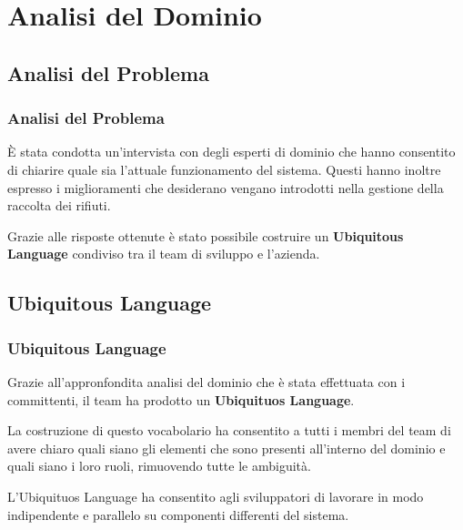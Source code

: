 \section{Analisi del Dominio}
\frame{\tableofcontents[currentsection]}

\subsection{Analisi del Problema}

\begin{frame}
    \frametitle{Analisi del Problema}
    È stata condotta un'intervista con degli esperti di dominio che hanno consentito di chiarire quale sia l'attuale
    funzionamento del sistema.
    Questi hanno inoltre espresso i miglioramenti che desiderano vengano introdotti nella gestione della raccolta dei
    rifiuti.

    \bigskip

    Grazie alle risposte ottenute è stato possibile costruire un \textbf{Ubiquitous Language} condiviso tra il team di sviluppo
    e l'azienda.

\end{frame}

\subsection{Ubiquitous Language}

\begin{frame}
    \frametitle{Ubiquitous Language}
    Grazie all'appronfondita analisi del dominio che è stata effettuata con i committenti, il team ha prodotto un
    \textbf{Ubiquituos Language}.

    \bigskip

    La costruzione di questo vocabolario ha consentito a tutti i membri del team di avere chiaro quali siano gli
    elementi che sono presenti all'interno del dominio e quali siano i loro ruoli, rimuovendo tutte le ambiguità.

    \bigskip

    L'Ubiquituos Language ha consentito agli sviluppatori di lavorare in modo indipendente e parallelo su componenti
    differenti del sistema.

\end{frame}

